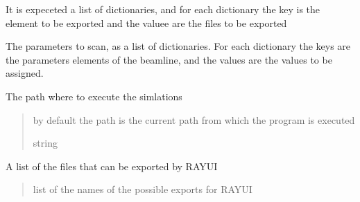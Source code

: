 \documentclass[letterpaper,10pt,english]{sphinxmanual}
\begin{document}
\begin{fulllineitems}
\begin{fulllineitems}
\sphinxAtStartPar
It is expeceted a list of dictionaries, and for each dictionary the key is the element
to be exported and the valuee are the files to be exported

\end{fulllineitems}


\begin{fulllineitems}
\label{\detokenize{index:raypyng.simulate.Simulate.params}}
\pysigstartsignatures
{}
\pysigstopsignatures
\sphinxAtStartPar
The parameters to scan, as a list of dictionaries.
For each dictionary the keys are the parameters elements of the beamline, and the values are the
values to be assigned.

\end{fulllineitems}


\begin{fulllineitems}
\label{\detokenize{index:raypyng.simulate.Simulate.path}}
\pysigstartsignatures
{}
\pysigstopsignatures
\sphinxAtStartPar
The path where to execute the simlations
\begin{quote}\begin{description}
\sphinxAtStartPar
by default the path is the current path from which
the program is executed

\sphinxAtStartPar
string

\end{description}\end{quote}

\end{fulllineitems}


\begin{fulllineitems}
\label{\detokenize{index:raypyng.simulate.Simulate.possible_exports}}
\pysigstartsignatures
{}
\pysigstopsignatures
\sphinxAtStartPar
A list of the files that can be exported by RAY\sphinxhyphen{}UI
\begin{quote}\begin{description}
\sphinxAtStartPar
list of the names of the possible exports for RAY\sphinxhyphen{}UI


\end{description}
\end{quote}
\end{fulllineitems}
\end{fulllineitems}
\end{document}

